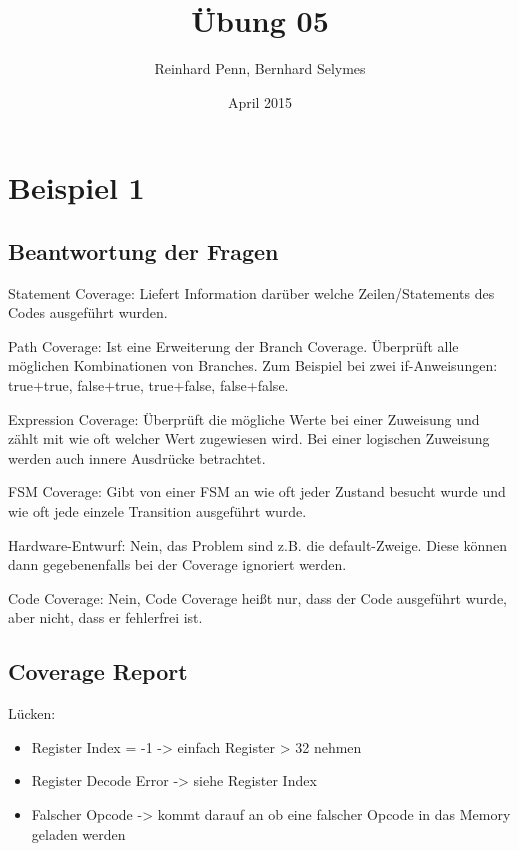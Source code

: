 \documentclass[12pt,a4paper]{article}
\begin{document}
\title{Übung 05}
\author{Reinhard Penn, Bernhard Selymes}
\date{April 2015}

\normalsize


\newcommand{\Uebung}{Coverage}
\newcommand{\srcpath}{../../src}
\newcommand{\simpath}{../../sim}



\section{Beispiel 1}
\subsection{Beantwortung der Fragen}
Statement Coverage: Liefert Information darüber welche Zeilen/Statements des Codes ausgeführt wurden.

Path Coverage: Ist eine Erweiterung der Branch Coverage. Überprüft alle möglichen Kombinationen von Branches. Zum Beispiel bei zwei if-Anweisungen: true+true, false+true, true+false, false+false.

Expression Coverage: Überprüft die mögliche Werte bei einer Zuweisung und zählt mit wie oft welcher Wert zugewiesen wird. Bei einer logischen Zuweisung werden auch innere Ausdrücke betrachtet.

FSM Coverage: Gibt von einer FSM an wie oft jeder Zustand besucht wurde und wie oft jede einzele Transition ausgeführt wurde.

Hardware-Entwurf: Nein, das Problem sind z.B. die default-Zweige. Diese können dann gegebenenfalls bei der Coverage ignoriert werden.

Code Coverage: Nein, Code Coverage heißt nur, dass der Code ausgeführt wurde, aber nicht, dass er fehlerfrei ist.

\subsection{Coverage Report}

Lücken: 
\begin{itemize}
	\item Register Index = -1	-> einfach Register > 32 nehmen
	\item Register Decode Error -> siehe Register Index
	\item Falscher Opcode -> kommt darauf an ob eine falscher Opcode in das Memory geladen werden
\end{itemize}
\end{document}
